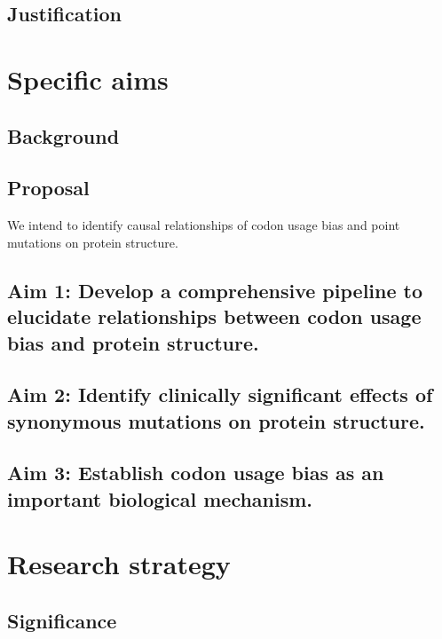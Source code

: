 \documentclass[11pt]{nih}
\begin{document}
\subsection{Justification}


\section{Specific aims}

\subsection{Background}

\subsection{Proposal}

We intend to identify causal relationships of codon usage bias and point mutations on protein structure.

\subsection{Aim 1: Develop a comprehensive pipeline to elucidate relationships between codon usage bias and protein structure.}

\subsection{Aim 2: Identify clinically significant effects of synonymous mutations on protein structure.}

\subsection{Aim 3: Establish codon usage bias as an important biological mechanism.}


\section{Research strategy}


\subsection{Significance}
\end{document}
